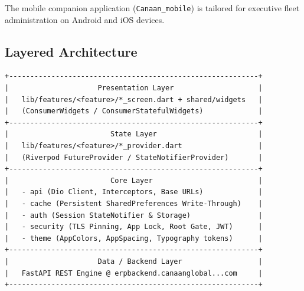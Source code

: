 \documentclass[11pt,a4paper]{article}
\begin{document}
The mobile companion application (\texttt{Canaan\_mobile}) is tailored for executive fleet administration on Android and iOS devices.

\subsection{Layered Architecture}
\begin{lstlisting}[style=asciiart]
+-----------------------------------------------------------+
|                     Presentation Layer                    |
|   lib/features/<feature>/*_screen.dart + shared/widgets   |
|   (ConsumerWidgets / ConsumerStatefulWidgets)             |
+-----------------------------------------------------------+
|                        State Layer                        |
|   lib/features/<feature>/*_provider.dart                  |
|   (Riverpod FutureProvider / StateNotifierProvider)       |
+-----------------------------------------------------------+
|                        Core Layer                         |
|   - api (Dio Client, Interceptors, Base URLs)             |
|   - cache (Persistent SharedPreferences Write-Through)    |
|   - auth (Session StateNotifier & Storage)                |
|   - security (TLS Pinning, App Lock, Root Gate, JWT)      |
|   - theme (AppColors, AppSpacing, Typography tokens)      |
+-----------------------------------------------------------+
|                     Data / Backend Layer                  |
|   FastAPI REST Engine @ erpbackend.canaanglobal...com     |
+-----------------------------------------------------------+
\end{lstlisting}
\end{document}

